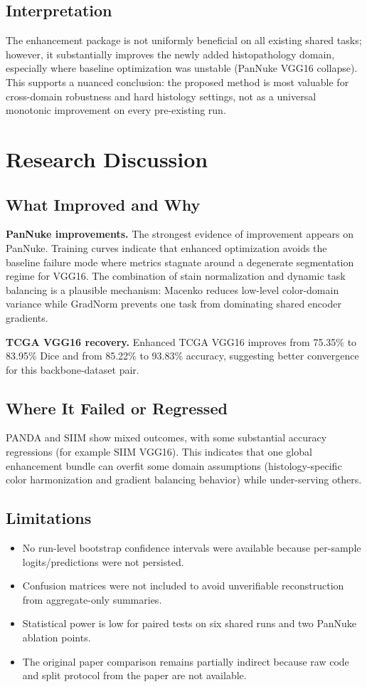 \documentclass[conference]{IEEEtran}
\begin{document}
\subsection{Interpretation}
The enhancement package is not uniformly beneficial on all existing shared tasks; however, it substantially improves the newly added histopathology domain, especially where baseline optimization was unstable (PanNuke VGG16 collapse). This supports a nuanced conclusion: the proposed method is most valuable for cross-domain robustness and hard histology settings, not as a universal monotonic improvement on every pre-existing run.

\section{Research Discussion}
\subsection{What Improved and Why}
\textbf{PanNuke improvements.} The strongest evidence of improvement appears on PanNuke. Training curves indicate that enhanced optimization avoids the baseline failure mode where metrics stagnate around a degenerate segmentation regime for VGG16. The combination of stain normalization and dynamic task balancing is a plausible mechanism: Macenko reduces low-level color-domain variance while GradNorm prevents one task from dominating shared encoder gradients.

\textbf{TCGA VGG16 recovery.} Enhanced TCGA VGG16 improves from 75.35\% to 83.95\% Dice and from 85.22\% to 93.83\% accuracy, suggesting better convergence for this backbone-dataset pair.

\subsection{Where It Failed or Regressed}
PANDA and SIIM show mixed outcomes, with some substantial accuracy regressions (for example SIIM VGG16). This indicates that one global enhancement bundle can overfit some domain assumptions (histology-specific color harmonization and gradient balancing behavior) while under-serving others. 

\subsection{Limitations}
\begin{itemize}
\item No run-level bootstrap confidence intervals were available because per-sample logits/predictions were not persisted.
\item Confusion matrices were not included to avoid unverifiable reconstruction from aggregate-only summaries.
\item Statistical power is low for paired tests on six shared runs and two PanNuke ablation points.
\item The original paper comparison remains partially indirect because raw code and split protocol from the paper are not available.
\end{itemize}
\end{document}
